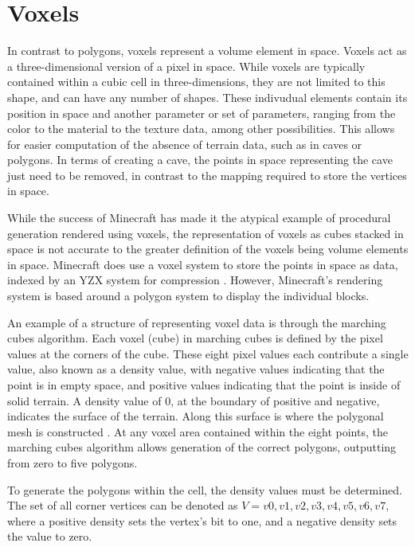 \documentclass[10pt]{report}
\begin{document}
		\section{Voxels}
	
		In contrast to polygons, voxels represent a volume element in space. Voxels act as a three-dimensional version of a pixel in space. While voxels are typically contained within a cubic cell in three-dimensions, they are not limited to this shape, and can have any number of shapes. These indivudual elements contain its position in space and another parameter or set of parameters, ranging from the color to the material to the texture data, among other possibilities. This allows for easier computation of the absence of terrain data, such as in caves or polygons. In terms of creating a cave, the points in space representing the cave just need to be removed, in contrast to the mapping required to store the vertices in space. 
		
		While the success of Minecraft has made it the atypical example of procedural generation rendered using voxels, the representation of voxels as cubes stacked in space is not accurate to the greater definition of the voxels being volume elements in space. Minecraft does use a voxel system to store the points in space as data, indexed by an YZX system for compression \cite{minecraft-voxel}. However, Minecraft's rendering system is based around a polygon system to display the individual blocks. 
		
		\label{pt:marching_cubes}
		An example of a structure of representing voxel data is through the marching cubes algorithm. Each voxel (cube) in marching cubes is defined by the pixel values at the corners of the cube. These eight pixel values each contribute a single value, also known as a density value, with negative values indicating that the point is in empty space, and positive values indicating that the point is inside of solid terrain. A density value of 0, at the boundary of positive and negative, indicates the surface of the terrain. Along this surface is where the polygonal mesh is constructed \cite{marching-cubes}. At any voxel area contained within the eight points, the marching cubes algorithm allows generation of the correct polygons, outputting from zero to five polygons.
		
		To generate the polygons within the cell, the density values must be determined. The set of all corner vertices can be denoted as \(V = {v0,v1,v2,v3,v4,v5,v6,v7}\), where a positive density sets the vertex's bit to one, and a negative density sets the value to zero. 
\end{document}
